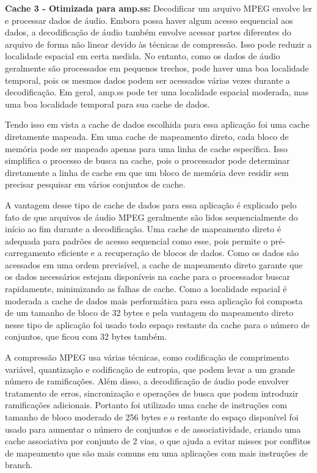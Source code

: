 \documentclass[12pt]{article}
\begin{document}
\textbf{Cache 3 - Otimizada para amp.ss:}
Decodificar um arquivo MPEG envolve ler e processar dados de áudio. Embora possa haver algum acesso sequencial aos dados, a decodificação de áudio também envolve acessar partes diferentes do arquivo de forma não linear devido às técnicas de compressão. Isso pode reduzir a localidade espacial em certa medida. No entanto, como os dados de áudio geralmente são processados em pequenos trechos, pode haver uma boa localidade temporal, pois os mesmos dados podem ser acessados várias vezes durante a decodificação. Em geral, amp.ss pode ter uma localidade espacial moderada, mas uma boa localidade temporal para sua cache de dados.

Tendo isso em vista a cache de dados escolhida para essa aplicação foi uma cache diretamente mapeada. Em uma cache de mapeamento direto, cada bloco de memória pode ser mapeado apenas para uma linha de cache específica. Isso simplifica o processo de busca na cache, pois o processador pode determinar diretamente a linha de cache em que um bloco de memória deve residir sem precisar pesquisar em vários conjuntos de cache.

A vantagem desse tipo de cache de dados para essa aplicação é explicado pelo fato de que arquivos de áudio MPEG geralmente são lidos sequencialmente do início ao fim durante a decodificação. Uma cache de mapeamento direto é adequada para padrões de acesso sequencial como esse, pois permite o pré-carregamento eficiente e a recuperação de blocos de dados. Como os dados são acessados em uma ordem previsível, a cache de mapeamento direto garante que os dados necessários estejam disponíveis na cache para o processador buscar rapidamente, minimizando as falhas de cache. Como a localidade espacial é moderada a cache de dados mais performática para essa aplicação foi composta de um tamanho de bloco de 32 bytes e pela vantagem do mapeamento direto nesse tipo de aplicação foi usado todo espaço restante da cache para o número de conjuntos, que ficou com 32 bytes também.

A compressão MPEG usa várias técnicas, como codificação de comprimento variável, quantização e codificação de entropia, que podem levar a um grande número de ramificações. Além disso, a decodificação de áudio pode envolver tratamento de erros, sincronização e operações de busca que podem introduzir ramificações adicionais. Portanto foi utilizado uma cache de instruções com tamanho de bloco moderado de 256 bytes e o restante do espaço disponível foi usado para aumentar o número de conjuntos e de associatividade, criando uma cache associativa por conjunto de 2 vias, o que ajuda a evitar misses por conflitos de mapeamento que são mais comuns em uma aplicações com mais instruções de branch.
\end{document}
